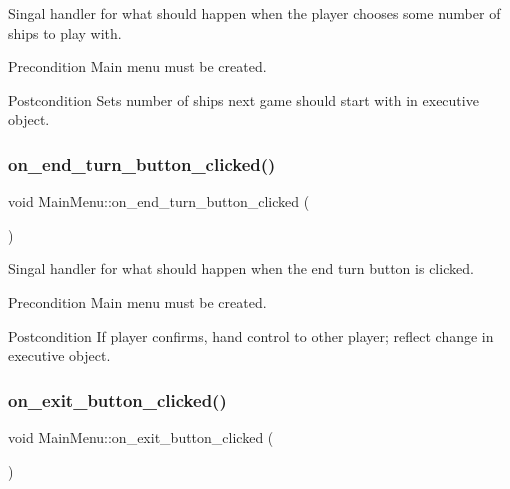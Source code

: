 Singal handler for what should happen when the player chooses some number of ships to play with. 

\begin{DoxyPrecond}{Precondition}
Main menu must be created. 
\end{DoxyPrecond}
\begin{DoxyPostcond}{Postcondition}
Sets number of ships next game should start with in executive object. 
\end{DoxyPostcond}
\mbox{\label{classMainMenu_a08d40ee75aeed409f4ec19008e22fae2}} 
\subsubsection{\texorpdfstring{on\_end\_turn\_button\_clicked()}{on\_end\_turn\_button\_clicked()}}
{\footnotesize\ttfamily void Main\+Menu\+::on\+\_\+end\+\_\+turn\+\_\+button\+\_\+clicked (\begin{DoxyParamCaption}{ }\end{DoxyParamCaption})\hspace{0.3cm}{\ttfamily [protected]}}



Singal handler for what should happen when the end turn button is clicked. 

\begin{DoxyPrecond}{Precondition}
Main menu must be created. 
\end{DoxyPrecond}
\begin{DoxyPostcond}{Postcondition}
If player confirms, hand control to other player; reflect change in executive object. 
\end{DoxyPostcond}
\mbox{\label{classMainMenu_a9b9f6812f90946e135022cf5826d8eed}} 
\subsubsection{\texorpdfstring{on\_exit\_button\_clicked()}{on\_exit\_button\_clicked()}}
{\footnotesize\ttfamily void Main\+Menu\+::on\+\_\+exit\+\_\+button\+\_\+clicked (\begin{DoxyParamCaption}{ }\end{DoxyParamCaption})\hspace{0.3cm}{\ttfamily [protected]}}



